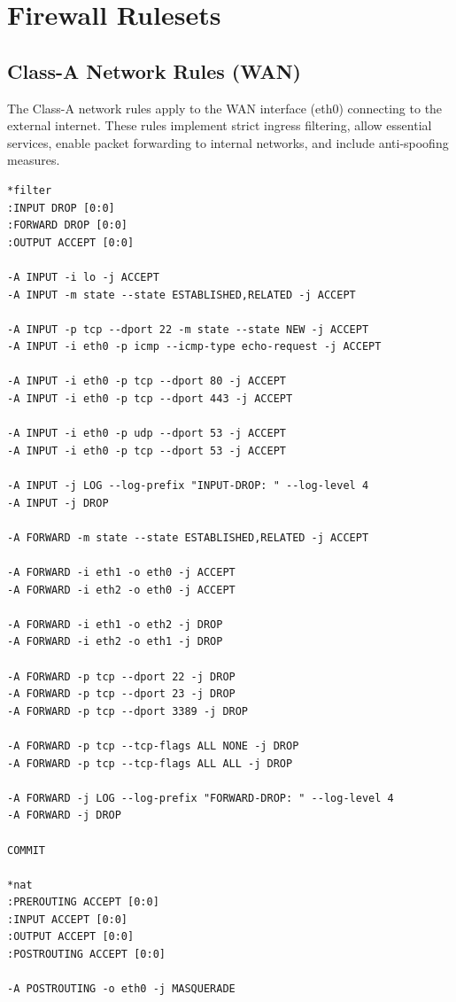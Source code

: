 \section{Firewall Rulesets}
\label{app:rules}

\subsection{Class-A Network Rules (WAN)}
\label{subsec:class-a-rules}

The Class-A network rules apply to the WAN interface (eth0) connecting to the external internet. These rules implement strict ingress filtering, allow essential services, enable packet forwarding to internal networks, and include anti-spoofing measures.

\begin{verbatim}
*filter
:INPUT DROP [0:0]
:FORWARD DROP [0:0]
:OUTPUT ACCEPT [0:0]

-A INPUT -i lo -j ACCEPT
-A INPUT -m state --state ESTABLISHED,RELATED -j ACCEPT

-A INPUT -p tcp --dport 22 -m state --state NEW -j ACCEPT
-A INPUT -i eth0 -p icmp --icmp-type echo-request -j ACCEPT

-A INPUT -i eth0 -p tcp --dport 80 -j ACCEPT
-A INPUT -i eth0 -p tcp --dport 443 -j ACCEPT

-A INPUT -i eth0 -p udp --dport 53 -j ACCEPT
-A INPUT -i eth0 -p tcp --dport 53 -j ACCEPT

-A INPUT -j LOG --log-prefix "INPUT-DROP: " --log-level 4
-A INPUT -j DROP

-A FORWARD -m state --state ESTABLISHED,RELATED -j ACCEPT

-A FORWARD -i eth1 -o eth0 -j ACCEPT
-A FORWARD -i eth2 -o eth0 -j ACCEPT

-A FORWARD -i eth1 -o eth2 -j DROP
-A FORWARD -i eth2 -o eth1 -j DROP

-A FORWARD -p tcp --dport 22 -j DROP
-A FORWARD -p tcp --dport 23 -j DROP
-A FORWARD -p tcp --dport 3389 -j DROP

-A FORWARD -p tcp --tcp-flags ALL NONE -j DROP
-A FORWARD -p tcp --tcp-flags ALL ALL -j DROP

-A FORWARD -j LOG --log-prefix "FORWARD-DROP: " --log-level 4
-A FORWARD -j DROP

COMMIT

*nat
:PREROUTING ACCEPT [0:0]
:INPUT ACCEPT [0:0]
:OUTPUT ACCEPT [0:0]
:POSTROUTING ACCEPT [0:0]

-A POSTROUTING -o eth0 -j MASQUERADE


\end{verbatim}
